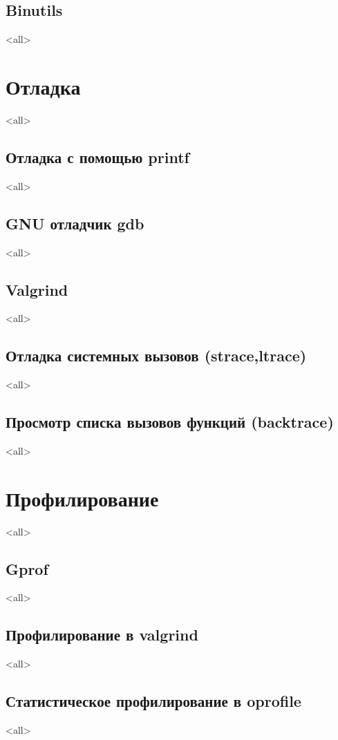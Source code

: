 \section{Binutils}
\mode<all>{}

\chapter{Отладка}
\mode<all>{}
\section{Отладка с помощью printf}
\mode<all>{}
\section{GNU отладчик gdb}
\mode<all>{}
\section{Valgrind}
\mode<all>{}
\section{Отладка системных вызовов (strace,ltrace)}
\mode<all>{}
\section{Просмотр списка вызовов функций (backtrace)}
\mode<all>{}

\chapter{Профилирование}
\mode<all>{}
\section{Gprof}
\mode<all>{}
\section{Профилирование в valgrind}
\mode<all>{}
\section[oprofile]{Статистическое профилирование в oprofile}
\mode<all>{}
